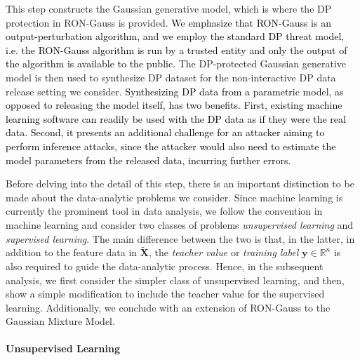 \documentclass[USenglish,oneside,twocolumn]{article}
\theoremstyle{definition}
\theoremstyle{remark}
\theoremstyle{plain}
\theoremstyle{plain}
\newcommand{\chang}{\textcolor{black}}
\begin{document}
This step constructs the Gaussian generative model, which is where
the DP protection in RON-Gauss is provided. \chang{We emphasize that RON-Gauss is an output-perturbation algorithm, and we employ the standard DP threat model, i.e. the RON-Gauss algorithm is run by a trusted entity and only the output of the algorithm is available to the public.} The DP-protected Gaussian
generative model is then used to synthesize DP dataset for the non-interactive
DP data release setting we consider. \chang{Synthesizing DP data from a parametric model, as opposed to releasing the model itself, has two benefits. First, existing machine learning software can readily be used with the DP data as if they were the real data. Second, it presents an additional challenge for an attacker aiming to perform inference attacks, since the attacker would also need to estimate the model parameters from the released data, incurring further errors.}

Before delving into the detail
of this step, there is an important distinction to be made about the
data-analytic problems we consider. Since machine learning is currently
the prominent tool in data analysis, we follow the convention in machine
learning and consider two classes of problems \textendash{} \emph{unsupervised
learning} and \emph{supervised learning}. The main difference between
the two is that, in the latter, in addition to the feature data in
$\widetilde{\mathbf{X}}$, the \emph{teacher value} or \emph{training
label} $\mathbf{y}\in\mathbb{R}^{n}$ is also required to guide the
data-analytic process. Hence, in the subsequent analysis, we first consider the simpler class
of unsupervised learning, and then, show a simple modification to
include the teacher value for the supervised learning. Additionally,
we conclude with an extension of RON-Gauss to the Gaussian
Mixture Model.

 \vspace{-1em}
\paragraph{Unsupervised Learning}
\end{document}
